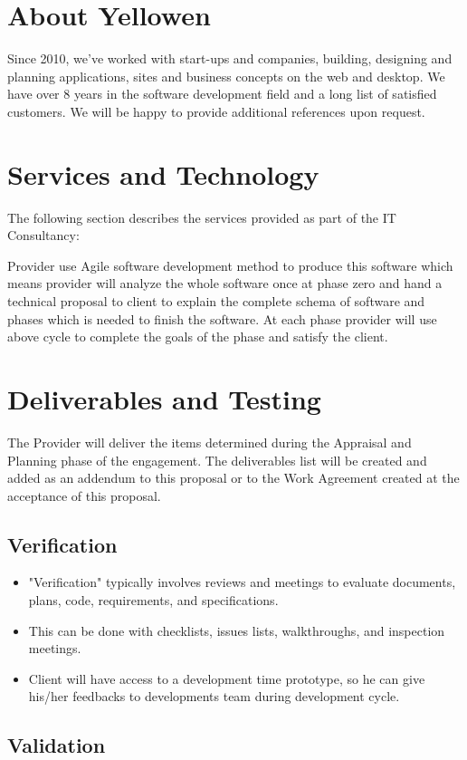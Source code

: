 \documentclass[a4paper,12pt]{article}
\begin{document}
\section*{About Yellowen}
Since 2010, we've worked with start-ups and companies, building, designing and planning applications,
sites and business concepts on the web and desktop. We have over 8 years in the software development field and a
long list of satisfied customers. We will be happy to provide additional references upon request.

\section*{Services and Technology}
The following section describes the services provided as part of the IT
Consultancy:

Provider use Agile software development method to produce this software
which means provider will analyze the whole software once at phase zero
and hand a technical proposal to client to explain the complete schema of
software and phases which is needed to finish the software. At each phase
provider will use above cycle to complete the goals of the phase and satisfy
the client.

\section*{Deliverables and Testing}
The Provider will deliver the items determined during the Appraisal and
Planning phase of the engagement. The deliverables list will be created and
added as an addendum to this proposal or to the Work Agreement created
at the acceptance of this proposal.


\subsection*{Verification}
\begin{itemize}
  \item {"Verification" typically involves reviews and meetings to evaluate
    documents, plans, code, requirements, and specifications.}
  \item{This can be done with checklists, issues lists, walkthroughs, and
    inspection meetings.}
  \item{Client will have access to a development time prototype, so he can give
    his/her feedbacks to developments team during development cycle.}
\end{itemize}

\subsection*{Validation}
\end{document}
